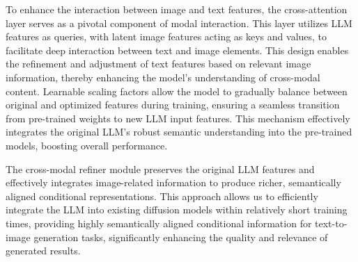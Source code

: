 To enhance the interaction between image and text features, the cross-attention layer serves as a pivotal component of modal interaction. This layer utilizes LLM features as queries, with latent image features acting as keys and values, to facilitate deep interaction between text and image elements. This design enables the refinement and adjustment of text features based on relevant image information, thereby enhancing the model's understanding of cross-modal content. Learnable scaling factors allow the model to gradually balance between original and optimized features during training, ensuring a seamless transition from pre-trained weights to new LLM input features. This mechanism effectively integrates the original LLM's robust semantic understanding into the pre-trained models, boosting overall performance.



The cross-modal refiner module preserves the original LLM features and effectively integrates image-related information to produce richer, semantically aligned conditional representations. This approach allows us to efficiently integrate the LLM into existing diffusion models within relatively short training times, providing highly semantically aligned conditional information for text-to-image generation tasks, significantly enhancing the quality and relevance of generated results.


